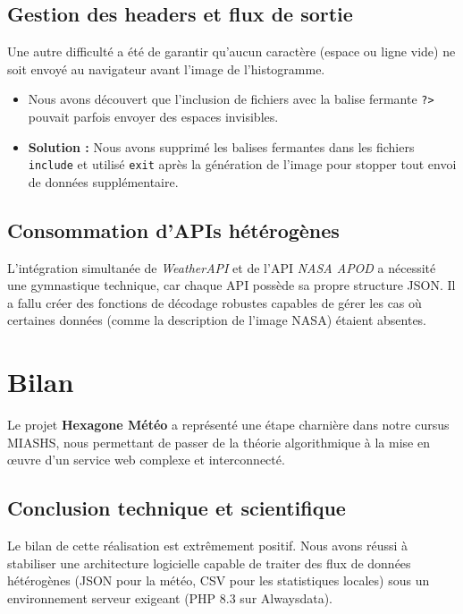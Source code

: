 \documentclass[12pt,a4paper]{article}
\begin{document}
\subsection{Gestion des headers et flux de sortie}
Une autre difficulté a été de garantir qu'aucun caractère (espace ou ligne vide) ne soit envoyé au navigateur avant l'image de l'histogramme. 
\begin{itemize}
    \item Nous avons découvert que l'inclusion de fichiers avec la balise fermante \texttt{?>} pouvait parfois envoyer des espaces invisibles.
    \item \textbf{Solution :} Nous avons supprimé les balises fermantes dans les fichiers \texttt{include} et utilisé \texttt{exit} après la génération de l'image pour stopper tout envoi de données supplémentaire.
\end{itemize}

\subsection{Consommation d'APIs hétérogènes}
L'intégration simultanée de \textit{WeatherAPI} et de l'API \textit{NASA APOD} a nécessité une gymnastique technique, car chaque API possède sa propre structure JSON. Il a fallu créer des fonctions de décodage robustes capables de gérer les cas où certaines données (comme la description de l'image NASA) étaient absentes.

\vfill
{} \par
\newpage

\section{Bilan}

Le projet \textbf{Hexagone Météo} a représenté une étape charnière dans notre cursus MIASHS, nous permettant de passer de la théorie algorithmique à la mise en œuvre d'un service web complexe et interconnecté.

\subsection{Conclusion technique et scientifique}
Le bilan de cette réalisation est extrêmement positif. Nous avons réussi à stabiliser une architecture logicielle capable de traiter des flux de données hétérogènes (JSON pour la météo, CSV pour les statistiques locales) sous un environnement serveur exigeant (PHP 8.3 sur Alwaysdata). 
\end{document}

